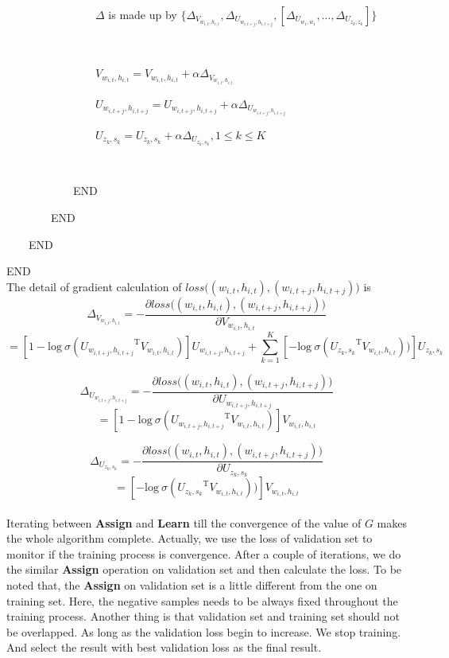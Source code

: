 \ \ \ \ \ \ \ \ \ \ \ \ \ \ \ \ $\Delta$ is made up by $ \{\Delta_{V_{w_{i,t},h_{i,t}}}, \Delta_{U_{w_{i,t+j},h_{i,t+j}}}, [\Delta_{U_{w_1,w_1}},\ldots,\Delta_{U_{z_k,z_k}}]\}$

\ \ \ \ \ \ \ \ \ \ \ \ \ \ \ \

\ \ \ \ \ \ \ \ \ \ \ \ \ \ \ \ $V_{w_{i,t},h_{i,t}} = V_{w_{i,t},h_{i,t}} + \alpha \Delta_{V_{w_{i,t},h_{i,t}}}$
 
\ \ \ \ \ \ \ \ \ \ \ \ \ \ \ \ $U_{w_{i,t+j},h_{i,t+j}} = U_{w_{i,t+j},h_{i,t+j}} + \alpha \Delta_{U_{w_{i,t+j},h_{i,t+j}}}$ 

\ \ \ \ \ \ \ \ \ \ \ \ \ \ \ \ $U_{z_k,s_k} = U_{z_k,s_k} + \alpha \Delta_{U_{z_k,s_k}}, 1\leq k\leq K$ 

\ \ \ \ \ \ \ \ \ \ \ \ \ \ \ \
 
\ \ \ \ \ \ \ \ \ \ \ \ END 

\ \ \ \ \ \ \ \  END

\ \ \ \ END

END\\

The detail of gradient calculation of $loss\big ( (w_{i,t},h_{i,t}),(w_{i,t+j},h_{i,t+j})\big )$ is
$$\Delta_{V_{w_{i,t},h_{i,t}}} = -\frac{\partial loss\big ( (w_{i,t},h_{i,t}),(w_{i,t+j},h_{i,t+j})\big )}{\partial V_{w_{i,t},h_{i,t}}} $$
$$= [1-\mathrm{log}\ \sigma({U_{w_{i,t+j},h_{i,t+j}}}^{\mathrm{T}}V_{w_{i,t},h_{i,t}})]
U_{w_{i,t+j},h_{i,t+j}}+\sum_{k=1}^K [-\mathrm{log}\ \sigma({U_{z_k,s_k}}^{\mathrm{T}}V_{w_{i,t},h_{i,t}}))]U_{z_k,s_k}$$

$$\Delta_{U_{w_{i,t+j},h_{i,t+j}}} = -\frac{\partial loss\big ( (w_{i,t},h_{i,t}),(w_{i,t+j},h_{i,t+j})\big )}{\partial U_{w_{i,t+j},h_{i,t+j}}}$$
$$=[1-\mathrm{log}\ \sigma({U_{w_{i,t+j},h_{i,t+j}}}^{\mathrm{T}}V_{w_{i,t},h_{i,t}})]
V_{w_{i,t},h_{i,t}}$$

$$\Delta_{U_{z_k,s_k}} = -\frac{\partial loss\big ( (w_{i,t},h_{i,t}),(w_{i,t+j},h_{i,t+j})\big )}{\partial U_{z_k,s_k}}$$
$$=[-\mathrm{log}\ \sigma({U_{z_k,s_k}}^{\mathrm{T}}V_{w_{i,t},h_{i,t}}))]V_{w_{i,t},h_{i,t}}$$


\paragraph{}
Iterating between \textbf{Assign} and \textbf{Learn} till the convergence of the value of $G$ makes the whole algorithm complete. Actually, we use the loss of validation set to monitor if the training process is convergence. After a couple of iterations, we do the similar \textbf{Assign} operation on validation set and then calculate the loss. To be noted that, the \textbf{Assign} on validation set is a little different from the one on training set. Here, the negative samples needs to be always fixed throughout the training process. Another thing is that validation set and training set should not be overlapped. As long as the validation loss begin to increase.  We stop training. And select the result with best validation loss as the final result. 

